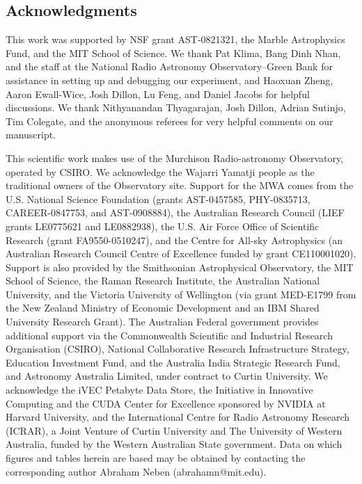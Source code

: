 \begin{subappendices}
\section*{Acknowledgments}
This work was supported by NSF grant AST-0821321, the Marble Astrophysics Fund, and the MIT School of Science. We thank Pat Klima, Bang Dinh Nhan, and the staff at the National Radio Astronomy Observatory--Green Bank for assistance in setting up and debugging our experiment, and Haoxuan Zheng, Aaron Ewall-Wice, Josh Dillon, Lu Feng, and Daniel Jacobs for helpful discussions. We thank Nithyanandan Thyagarajan, Josh Dillon, Adrian Sutinjo, Tim Colegate, and the anonymous referees for very helpful comments on our manuscript.

This scientific work makes use of the Murchison Radio-astronomy Observatory, operated by CSIRO. We acknowledge the Wajarri Yamatji people as the traditional owners of the Observatory site. Support for the MWA comes from the U.S. National Science Foundation (grants AST-0457585, PHY-0835713, CAREER-0847753, and AST-0908884), the Australian Research Council (LIEF grants LE0775621 and LE0882938), the U.S. Air Force Office of Scientific Research (grant FA9550-0510247), and the Centre for All-sky Astrophysics (an Australian Research Council Centre of Excellence funded by grant CE110001020). Support is also provided by the Smithsonian Astrophysical Observatory, the MIT School of Science, the Raman Research Institute, the Australian National University, and the Victoria University of Wellington (via grant MED-E1799 from the New Zealand Ministry of Economic Development and an IBM Shared University Research Grant). The Australian Federal government provides additional support via the Commonwealth Scientific and Industrial Research Organisation (CSIRO), National Collaborative Research Infrastructure Strategy, Education Investment Fund, and the Australia India Strategic Research Fund, and Astronomy Australia Limited, under contract to Curtin University. We acknowledge the iVEC Petabyte Data Store, the Initiative in Innovative Computing and the CUDA Center for Excellence sponsored by NVIDIA at Harvard University, and the International Centre for Radio Astronomy Research (ICRAR), a Joint Venture of Curtin University and The University of Western Australia, funded by the Western Australian State government. Data on which figures and tables herein are based may be obtained by contacting the corresponding author Abraham Neben (abrahamn@mit.edu).

\end{subappendices}


